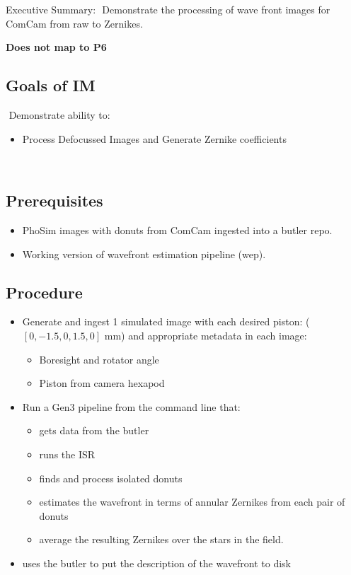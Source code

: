
Executive Summary:
​
Demonstrate the processing of wave front images for ComCam from raw to Zernikes.

\textbf{Does not map to P6}
​
\subsection{Goals of IM}
​
Demonstrate ability to:
​
\begin{itemize}
\item Process Defocussed Images and Generate Zernike coefficients
\end{itemize}
​
\subsection{Prerequisites}
\begin{itemize}
\item PhoSim images with donuts from ComCam ingested into a butler repo.
\item Working version of wavefront estimation pipeline (wep). 
\end{itemize}

\subsection{Procedure}
\begin{itemize}
\item Generate and ingest 1 simulated image with each desired piston: ($[0, -1.5, 0, 1.5, 0]$ mm)
  and appropriate
  metadata in each image:
  \begin{itemize}
  \item Boresight and rotator angle
  \item Piston from camera hexapod
  \end{itemize}
\item Run a Gen3 pipeline from the command line that:
  \begin{itemize}
  \item gets data from the butler
  \item runs the ISR
  \item finds and process isolated donuts
  \item estimates the wavefront in terms of annular Zernikes from each pair of donuts
  \item average the resulting Zernikes over the stars in the field.
  \end{itemize}
  \item uses the butler to put the description of the wavefront to disk
\end{itemize}

